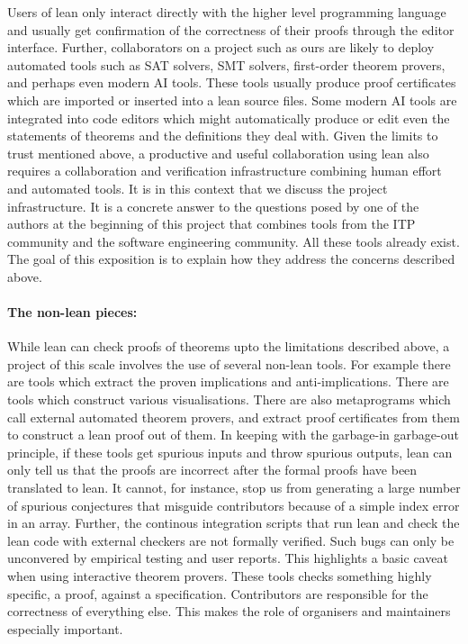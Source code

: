 Users of lean only interact directly with the higher level programming language and usually get confirmation of the correctness of their proofs through the editor interface. Further, collaborators on a project such as ours are likely to deploy automated tools such as SAT solvers, SMT solvers, first-order theorem provers, and perhaps even modern AI tools. These tools usually produce proof certificates which are imported or inserted into a lean source files. Some modern AI tools are integrated into code editors which might automatically produce or edit even the statements of theorems and the definitions they deal with. Given the limits to trust mentioned above, a productive and useful collaboration using lean also requires a collaboration and verification infrastructure combining human effort and automated tools. It is in this context that we discuss the project infrastructure. It is a concrete answer to the questions posed by one of the authors at the beginning of this project \cite{Tao_blog_Sep_2024} that combines tools from the ITP community and the software engineering community. All these tools already exist. The goal of this exposition is to explain how they address the concerns described above.


\paragraph{\textbf{The non-lean pieces:}} While lean can check proofs of theorems upto the limitations described above, a project of this scale involves the use of several non-lean tools. For example there are tools which extract the proven implications and anti-implications. There are tools which construct various visualisations. There are also metaprograms which call external automated theorem provers, and extract proof certificates from them to construct a lean proof out of them. In keeping with the garbage-in garbage-out principle, if these tools get spurious inputs and throw spurious outputs, lean can only tell us that the proofs are incorrect after the formal proofs have been translated to lean. It cannot, for instance, stop us from generating a large number of spurious conjectures that misguide contributors because of a simple index error in an array. Further, the continous integration scripts that run lean and check the lean code with external checkers are not formally verified. Such bugs can only be unconvered by empirical testing and user reports. This highlights a basic caveat when using interactive theorem provers. These tools checks something highly specific, a proof, against a specification. Contributors are responsible for the correctness of everything else. This makes the role of organisers and maintainers especially important.


